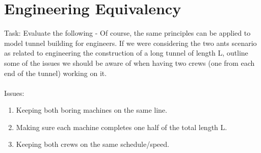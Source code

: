 \documentclass{report}
\begin{document}
\section*{Engineering Equivalency}
Task: Evaluate the following - Of course, the same principles can be applied to model tunnel building for engineers. If we were considering the two ants scenario as related to engineering the construction of a long tunnel of length L, outline some of the issues we should be aware of when having two crews (one from each end of the tunnel) working on it. \\ \\ 
Issues: \\
\begin{enumerate}
  \item Keeping both boring machines on the same line. 
  \item Making sure each machine completes one half of the total length L. 
  \item Keeping both crews on the same schedule/speed.
\end{enumerate}
\end{document}
